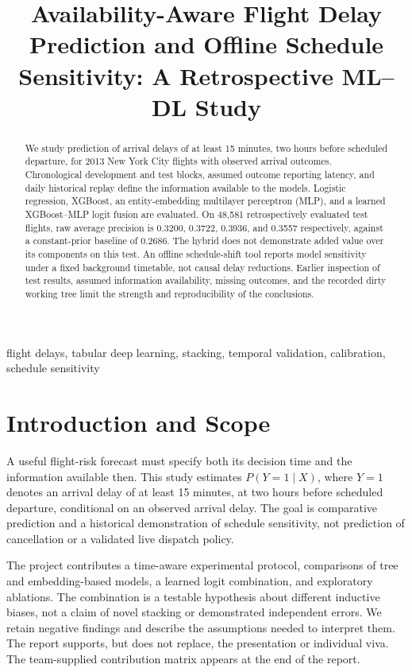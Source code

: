 \documentclass[conference]{IEEEtran}
\begin{document}
\title{Availability-Aware Flight Delay Prediction and Offline Schedule Sensitivity: A Retrospective ML--DL Study}
\author{}
\maketitle
\begin{abstract}
We study prediction of arrival delays of at least 15 minutes, two hours before scheduled departure, for 2013 New York City flights with observed arrival outcomes. Chronological development and test blocks, assumed outcome reporting latency, and daily historical replay define the information available to the models. Logistic regression, XGBoost, an entity-embedding multilayer perceptron (MLP), and a learned XGBoost--MLP logit fusion are evaluated. On 48,581 retrospectively evaluated test flights, raw average precision is 0.3200, 0.3722, 0.3936, and 0.3557 respectively, against a constant-prior baseline of 0.2686. The hybrid does not demonstrate added value over its components on this test. An offline schedule-shift tool reports model sensitivity under a fixed background timetable, not causal delay reductions. Earlier inspection of test results, assumed information availability, missing outcomes, and the recorded dirty working tree limit the strength and reproducibility of the conclusions.
\end{abstract}
\begin{IEEEkeywords}flight delays, tabular deep learning, stacking, temporal validation, calibration, schedule sensitivity\end{IEEEkeywords}
\section{Introduction and Scope}
A useful flight-risk forecast must specify both its decision time and the information available then. This study estimates $P(Y=1\mid X)$, where $Y=1$ denotes an arrival delay of at least 15 minutes, at two hours before scheduled departure, conditional on an observed arrival delay. The goal is comparative prediction and a historical demonstration of schedule sensitivity, not prediction of cancellation or a validated live dispatch policy.

The project contributes a time-aware experimental protocol, comparisons of tree and embedding-based models, a learned logit combination, and exploratory ablations. The combination is a testable hypothesis about different inductive biases, not a claim of novel stacking or demonstrated independent errors. We retain negative findings and describe the assumptions needed to interpret them. The report supports, but does not replace, the presentation or individual viva. The team-supplied contribution matrix appears at the end of the report.
\end{document}
